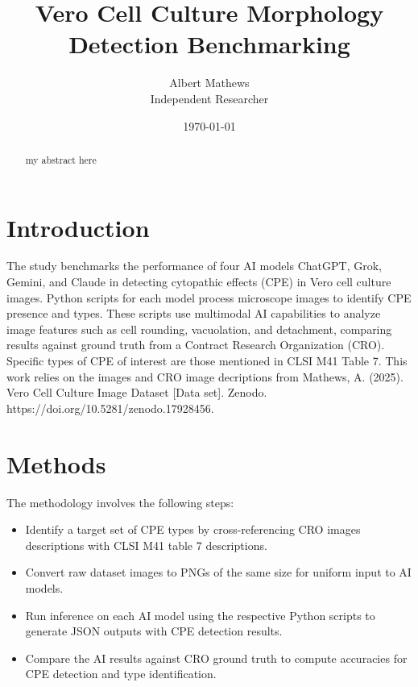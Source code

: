 \documentclass[12pt,a4paper]{article}
\title{\textbf{Vero Cell Culture Morphology Detection Benchmarking}}
\author{Albert Mathews \\ Independent Researcher}
\date{\today}
\begin{document}
\maketitle
\begin{abstract}
my abstract here
\end{abstract}
\section{Introduction}
The study benchmarks the performance of four AI models ChatGPT, Grok, Gemini, and Claude in detecting cytopathic effects (CPE) in Vero cell culture images. Python scripts for each model process microscope images to identify CPE presence and types. These scripts use multimodal AI capabilities to analyze image features such as cell rounding, vacuolation, and detachment, comparing results against ground truth from a Contract Research Organization (CRO). Specific types of CPE of interest are those mentioned in CLSI M41 Table 7. This work relies on the images and CRO image decriptions from Mathews, A. (2025). Vero Cell Culture Image Dataset [Data set]. Zenodo. https://doi.org/10.5281/zenodo.17928456.
\section{Methods}
The methodology involves the following steps:
\begin{itemize}
\item Identify a target set of CPE types by cross-referencing CRO images descriptions with CLSI M41 table 7 descriptions.
\item Convert raw dataset images to PNGs of the same size for uniform input to AI models.
\item Run inference on each AI model using the respective Python scripts to generate JSON outputs with CPE detection results.
\item Compare the AI results against CRO ground truth to compute accuracies for CPE detection and type identification.
\end{itemize}
\end{document}
